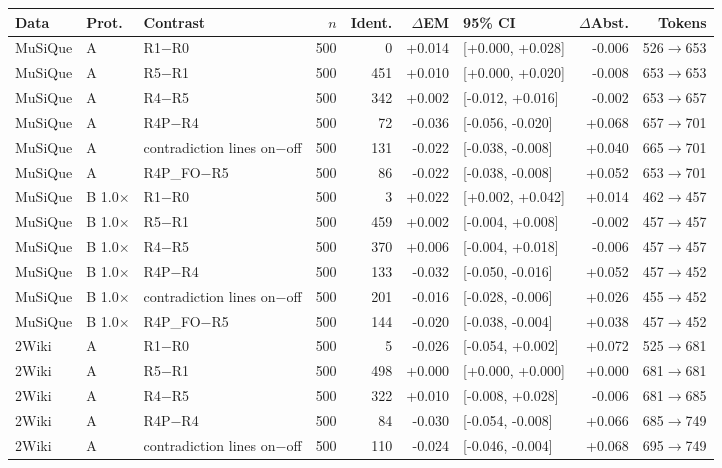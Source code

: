 \begin{table}[t]
\centering
\footnotesize
\begin{adjustbox}{max width=\linewidth}
\begin{tabular}{@{}lllrrrlrr@{}}
\toprule
Data & Prot. & Contrast & $n$ & Ident. & $\Delta$EM & 95\% CI & $\Delta$Abst. & Tokens \\
\midrule
MuSiQue & A & R1$-$R0 & 500 & 0 & +0.014 & [+0.000, +0.028] & -0.006 & 526$\to$653 \\
MuSiQue & A & R5$-$R1 & 500 & 451 & +0.010 & [+0.000, +0.020] & -0.008 & 653$\to$653 \\
MuSiQue & A & R4$-$R5 & 500 & 342 & +0.002 & [-0.012, +0.016] & -0.002 & 653$\to$657 \\
MuSiQue & A & R4P$-$R4 & 500 & 72 & -0.036 & [-0.056, -0.020] & +0.068 & 657$\to$701 \\
MuSiQue & A & contradiction lines on$-$off & 500 & 131 & -0.022 & [-0.038, -0.008] & +0.040 & 665$\to$701 \\
MuSiQue & A & R4P\_FO$-$R5 & 500 & 86 & -0.022 & [-0.038, -0.008] & +0.052 & 653$\to$701 \\
MuSiQue & B 1.0$\times$ & R1$-$R0 & 500 & 3 & +0.022 & [+0.002, +0.042] & +0.014 & 462$\to$457 \\
MuSiQue & B 1.0$\times$ & R5$-$R1 & 500 & 459 & +0.002 & [-0.004, +0.008] & -0.002 & 457$\to$457 \\
MuSiQue & B 1.0$\times$ & R4$-$R5 & 500 & 370 & +0.006 & [-0.004, +0.018] & -0.006 & 457$\to$457 \\
MuSiQue & B 1.0$\times$ & R4P$-$R4 & 500 & 133 & -0.032 & [-0.050, -0.016] & +0.052 & 457$\to$452 \\
MuSiQue & B 1.0$\times$ & contradiction lines on$-$off & 500 & 201 & -0.016 & [-0.028, -0.006] & +0.026 & 455$\to$452 \\
MuSiQue & B 1.0$\times$ & R4P\_FO$-$R5 & 500 & 144 & -0.020 & [-0.038, -0.004] & +0.038 & 457$\to$452 \\
\midrule
2Wiki & A & R1$-$R0 & 500 & 5 & -0.026 & [-0.054, +0.002] & +0.072 & 525$\to$681 \\
2Wiki & A & R5$-$R1 & 500 & 498 & +0.000 & [+0.000, +0.000] & +0.000 & 681$\to$681 \\
2Wiki & A & R4$-$R5 & 500 & 322 & +0.010 & [-0.008, +0.028] & -0.006 & 681$\to$685 \\
2Wiki & A & R4P$-$R4 & 500 & 84 & -0.030 & [-0.054, -0.008] & +0.066 & 685$\to$749 \\
2Wiki & A & contradiction lines on$-$off & 500 & 110 & -0.024 & [-0.046, -0.004] & +0.068 & 695$\to$749 \\

\end{tabular}
\end{adjustbox}
\end{table}

